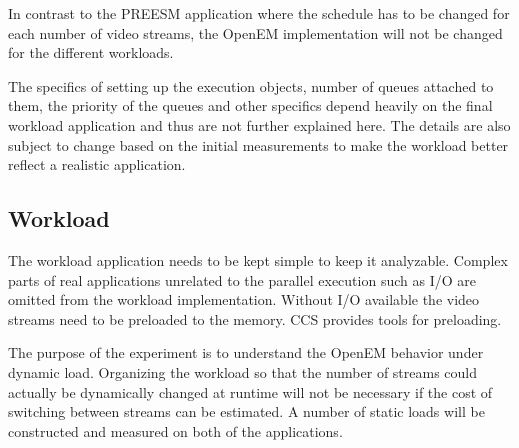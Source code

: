 In contrast to the PREESM application where the schedule has to be changed for each number of video streams, the OpenEM implementation will not be changed for the different workloads.

The specifics of setting up the execution objects, number of queues attached to them, the priority of the queues and other specifics depend heavily on the final workload application and thus are not further explained here. The details are also subject to change based on the initial measurements to make the workload better reflect a realistic application.
\subsection{Workload}
The workload application needs to be kept simple to keep it analyzable. Complex parts of real applications unrelated to the parallel execution such as I/O are omitted from the workload implementation. Without I/O available the video streams need to be preloaded to the memory. CCS provides tools for preloading.

The purpose of the experiment is to understand the OpenEM behavior under dynamic load. Organizing the workload so that the number of streams could actually be dynamically changed at runtime will not be necessary if the cost of switching between streams can be estimated. A number of static loads will be constructed and measured on both of the applications.